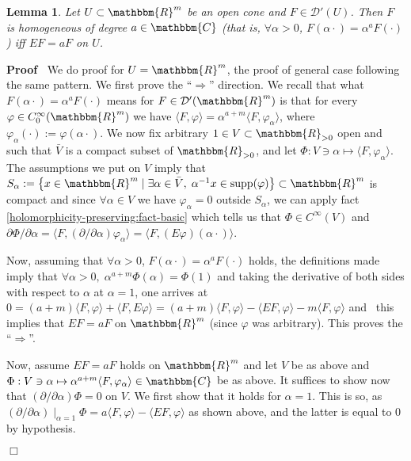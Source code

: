 \documentclass{article}
\newcommand{\assign}{:=}
\newcommand{\comma}{{,}}
\newcommand{\tmop}[1]{\ensuremath{\operatorname{#1}}}
\renewenvironment{proof}{\noindent\textbf{Proof\ }}{\hspace*{\fill}$\Box$\medskip}
\newtheorem{lemma}[proposition]{Lemma}
\theoremstyle{remark}
\begin{document}
\begin{lemma}
  \label{lem67:lem-homogImpliesE}Let $U \subset \mathbbm{R}^m$ be an open cone
  and $F \in \mathcal{D}' (U)$. Then $F$ is homogeneous of degree $a \in
  \mathbbm{C}$ (that is, $\forall \alpha > 0$, $F (\alpha \cdot) = \alpha^a F
  (\cdot)$) iff $E F = a F$ on $U$.
\end{lemma}

\begin{proof}
  We do proof for $U =\mathbbm{R}^m$, the proof of general case following the
  same pattern. We first prove the ``$\Rightarrow$'' direction. We recall that
  what $F (\alpha \cdot) = \alpha^a F (\cdot)$ means for $F \in \mathcal{D}'
  (\mathbbm{R}^m)$ is that for every $\varphi \in C^{\infty}_0
  (\mathbbm{R}^m)$ we have $\langle F, \varphi \rangle = \alpha^{a + m}
  \langle F, \varphi_{\alpha} \rangle$, where $\varphi_{\alpha} (\cdot)
  \assign \varphi (\alpha \cdot)$. We now fix arbitrary $1 \in V \subset
  \mathbbm{R}_{> 0}$ open and such that $\bar{V}$ is a compact subset of
  $\mathbbm{R}_{> 0}$, and let $\Phi : V \ni \alpha \mapsto \langle F,
  \varphi_{\alpha} \rangle$. The assumptions we put on $V$ imply that
  $S_{\alpha} \assign \left\{ x \in \mathbbm{R}^m \mid \exists \alpha \in
  \bar{V}, \; \alpha^{- 1} x \in \tmop{supp} (\varphi) \right\} \subset
  \mathbbm{R}^m$ is compact and since $\forall \alpha \in V$ we have
  $\varphi_{\alpha} = 0$ outside $S_{\alpha}$, we can apply fact
  \ref{holomorphicity-preserving:fact-basic} which tells us that $\Phi \in
  C^{\infty} (V)$ and $\partial \Phi / \partial \alpha = \langle F, (\partial
  / \partial \alpha) \varphi_{\alpha} \rangle = \langle F, (E \varphi) (\alpha
  \cdot) \rangle$.
  
  Now, assuming that $\forall \alpha > 0$, $F (\alpha \cdot) = \alpha^a F
  (\cdot)$ holds, the definitions made imply that $\forall \alpha > 0, \;
  \alpha^{a + m} \Phi (\alpha) = \Phi (1)$ and taking the derivative of both
  sides with respect to $\alpha$ at $\alpha = 1$, one arrives at $0 = (a + m)
  \langle F, \varphi \rangle + \langle F, E \varphi \rangle = (a + m) \langle
  F, \varphi \rangle - \langle E F, \varphi \rangle - m \langle F \comma
  \varphi \rangle$ and \ this implies that $E F = a F$ on $\mathbbm{R}^m$
  (since $\varphi$ was arbitrary). This proves the ``$\Rightarrow$''.
  
  Now, assume $E F = a F$ holds on $\mathbbm{R}^m$ and let $V$ be as above and
  $\Phi : V \ni \alpha \mapsto \alpha^{a + m} \langle F, \varphi_{\alpha}
  \rangle \in \mathbbm{C}$ be as above. It suffices to show now that
  $(\partial / \partial \alpha) \Phi = 0$ on $V$. We first show that it holds
  for $\alpha = 1$. This is so, as $(\partial / \partial \alpha)
  \mid_{\alpha = 1} \Phi = a \langle F, \varphi \rangle - \langle E F,
  \varphi \rangle$ as shown above, and the latter is equal to 0 by hypothesis.
  

\end{proof}
\end{document}
